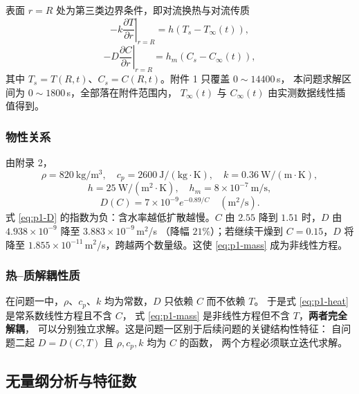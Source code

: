 \documentclass[12pt,a4paper,fontset=none]{ctexart}
\begin{document}
表面 $r=R$ 处为第三类边界条件，即对流换热与对流传质
\begin{equation}
  -k\left.\frac{\partial T}{\partial r}\right|_{r=R}
  =h\left(T_s-T_\infty(t)\right),
  \label{eq:p1-bc-heat}
\end{equation}
\begin{equation}
  -D\left.\frac{\partial C}{\partial r}\right|_{r=R}
  =h_m\left(C_s-C_\infty(t)\right),
  \label{eq:p1-bc-mass}
\end{equation}
其中 $T_s=T(R,t)$、$C_s=C(R,t)$。附件 1 只覆盖 $0\sim14400$\,s，
本问题求解区间为 $0\sim1800$\,s，全部落在附件范围内，
$T_\infty(t)$ 与 $C_\infty(t)$ 由实测数据线性插值得到。

\subsubsection{物性关系}

由附录 2，
\begin{equation}
  \rho=820\ \mathrm{kg/m^3},\quad
  c_p=2600\ \mathrm{J/(kg\cdot K)},\quad
  k=0.36\ \mathrm{W/(m\cdot K)},
\end{equation}
\begin{equation}
  h=25\ \mathrm{W/(m^2\cdot K)},\quad
  h_m=8\times10^{-7}\ \mathrm{m/s},
\end{equation}
\begin{equation}
  D(C)=7\times10^{-9}e^{-0.89/C}\quad(\mathrm{m^2/s}).
  \label{eq:p1-D}
\end{equation}
式 \eqref{eq:p1-D} 的指数为负：含水率越低扩散越慢。$C$ 由 $2.55$ 降到
$1.51$ 时，$D$ 由 $4.938\times10^{-9}$ 降至 $3.883\times10^{-9}$\,m$^2$/s
（降幅 $21\%$）；若继续干燥到 $C=0.15$，$D$ 将降至
$1.855\times10^{-11}$\,m$^2$/s，跨越两个数量级。这使 \eqref{eq:p1-mass}
成为非线性方程。

\subsubsection{热--质解耦性质}

在问题一中，$\rho$、$c_p$、$k$ 均为常数，$D$ 只依赖 $C$ 而不依赖 $T$。
于是式 \eqref{eq:p1-heat} 是常系数线性方程且不含 $C$，
式 \eqref{eq:p1-mass} 是非线性方程但不含 $T$，\textbf{两者完全解耦}，
可以分别独立求解。这是问题一区别于后续问题的关键结构性特征：
自问题二起 $D=D(C,T)$ 且 $\rho,c_p,k$ 均为 $C$ 的函数，
两个方程必须联立迭代求解。

\subsection{无量纲分析与特征数}
\end{document}
